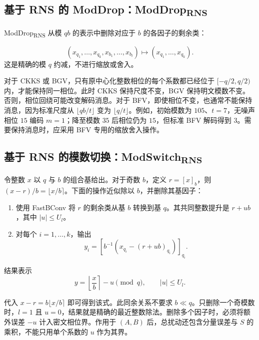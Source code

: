 \subsection{基于 RNS 的 ModDrop：\textsf{ModDrop\textsubscript{RNS}}}
\label{subsec:rns-moddrop}

\textsf{ModDrop\textsubscript{RNS}} 从模 $qb$ 的表示中删除对应于 $b$ 的各因子的剩余类：
\begin{tcolorbox}[title={\textbf{\tboxlabel{\ref*{subsec:rns-moddrop}} \textsf{ModDrop\textsubscript{RNS}}}}]
\[
(x_{q_1},\ldots,x_{q_k},x_{b_1},\ldots,x_{b_l})
\longmapsto(x_{q_1},\ldots,x_{q_k}).
\]
这是精确的模 $q$ 约减，不进行缩放或舍入。
\end{tcolorbox}

对于 CKKS 或 BGV，只有原中心化整数相位的每个系数都已经位于 $[-q/2,q/2)$ 内，才能保持同一相位。此时 CKKS 保持尺度不变，BGV 保持明文模数不变。否则，相位回绕可能改变解码消息。对于 BFV，即使相位不变，也通常不能保持消息，因为标准尺度从 $\lfloor qb/t\rfloor$ 变为 $\lfloor q/t\rfloor$。例如，初始模数为 $105$、$t=7$，无噪声相位 $15$ 编码 $m=1$；降至模数 $35$ 后相位仍为 $15$，但标准 BFV 解码得到 $3$。需要保持消息时，应采用 BFV 专用的缩放舍入操作。

\subsection{基于 RNS 的模数切换：\textsf{ModSwitch\textsubscript{RNS}}}
\label{subsec:rns-modswitch}

令整数 $x$ 以 $q$ 与 $b$ 的组合基给出。对于奇数 $b$，定义 $r=[x]_b$，则 $(x-r)/b=\lfloor x/b\rceil$。下面的操作近似除以 $b$，并删除其基因子：
\begin{tcolorbox}[title={\textbf{\tboxlabel{\ref*{subsec:rns-modswitch}} \textsf{ModSwitch\textsubscript{RNS}}}}]
\begin{enumerate}
\item 使用 \textsf{FastBConv} 将 $r$ 的剩余类从基 $b$ 转换到基 $q$。其共同整数提升是 $r+ub$，其中 $|u|\leq U_l$。
\item 对每个 $i=1,\ldots,k$，输出
\[
y_i=[b^{-1}(x_{q_i}-(r+ub)_{q_i})]_{q_i}.
\]
\end{enumerate}
结果表示
\[
y=\left\lfloor\frac{x}{b}\right\rceil-u\pmod q,\qquad |u|\leq U_l.
\]
\end{tcolorbox}

代入 $x-r=b\lfloor x/b\rceil$ 即可得到该式。此同余关系不要求 $b\ll q$。只删除一个奇模数时，$l=1$ 且 $u=0$，结果就是精确的最近整数除法。删除多个因子时，必须将额外误差 $-u$ 计入密文相位界。作用于 $(A,B)$ 后，总扰动还包含分量误差与 $S$ 的乘积，不能只用单个系数的 $u$ 作为其界。

